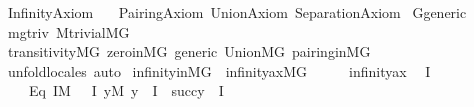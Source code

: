 %
\begin{isabellebody}%
%
%
\isadelimdocument
%
\endisadelimdocument
%
\isatagdocument
%
\isamarkuptrue%
%
\endisatagdocument
{\isafolddocument}%
%
\isadelimdocument
%
\endisadelimdocument
%
\isadelimtheory
%
\endisadelimtheory
%
\isatagtheory
{}\isamarkupfalse%
\ Infinity{\isacharunderscore}{\kern0pt}Axiom\isanewline
\ \ \ Pairing{\isacharunderscore}{\kern0pt}Axiom\ Union{\isacharunderscore}{\kern0pt}Axiom\ Separation{\isacharunderscore}{\kern0pt}Axiom\isanewline
{}%
\endisatagtheory
{\isafoldtheory}%
%
\isadelimtheory
\isanewline
%
\endisadelimtheory
\isanewline
{}\isamarkupfalse%
\ G{\isacharunderscore}{\kern0pt}generic\ \isanewline
\isanewline
{}\isamarkupfalse%
\ mg{\isacharunderscore}{\kern0pt}triv{\isacharcolon}{\kern0pt}\ M{\isacharunderscore}{\kern0pt}trivial{\isachardoublequoteopen}{\isacharhash}{\kern0pt}{\isacharhash}{\kern0pt}M{\isacharbrackleft}{\kern0pt}G{\isacharbrackright}{\kern0pt}{\isachardoublequoteclose}\isanewline
%
\isadelimproof
\ \ %
\endisadelimproof
%
\isatagproof
{}\isamarkupfalse%
\ transitivity{\isacharunderscore}{\kern0pt}MG\ zero{\isacharunderscore}{\kern0pt}in{\isacharunderscore}{\kern0pt}MG\ generic\ Union{\isacharunderscore}{\kern0pt}MG\ pairing{\isacharunderscore}{\kern0pt}in{\isacharunderscore}{\kern0pt}MG\isanewline
\ \ \isamarkupfalse%
\ unfold{\isacharunderscore}{\kern0pt}locales\ auto%
\endisatagproof
{\isafoldproof}%
%
\isadelimproof
\isanewline
%
\endisadelimproof
\isanewline
{}\isamarkupfalse%
\ infinity{\isacharunderscore}{\kern0pt}in{\isacharunderscore}{\kern0pt}MG\ {\isacharcolon}{\kern0pt}\ {\isachardoublequoteopen}infinity{\isacharunderscore}{\kern0pt}ax{\isacharparenleft}{\kern0pt}{\isacharhash}{\kern0pt}{\isacharhash}{\kern0pt}M{\isacharbrackleft}{\kern0pt}G{\isacharbrackright}{\kern0pt}{\isacharparenright}{\kern0pt}{\isachardoublequoteclose}\isanewline
%
\isadelimproof
%
\endisadelimproof
%
\isatagproof
{}\isamarkupfalse%
\ {\isacharminus}{\kern0pt}\isanewline
\ \ \isamarkupfalse%
\ infinity{\isacharunderscore}{\kern0pt}ax\ \isamarkupfalse%
\ I\ \isanewline
\ \ \ \ Eq{}{\isacharcolon}{\kern0pt}\ {\isachardoublequoteopen}I{\isasymin}M{\isachardoublequoteclose}\ {\isachardoublequoteopen}{}\ {\isasymin}\ I{\isachardoublequoteclose}\ {\isachardoublequoteopen}{\isasymforall}y{\isasymin}M{\isachardot}{\kern0pt}\ y\ {\isasymin}\ I\ {\isasymlongrightarrow}\ succ{\isacharparenleft}{\kern0pt}y{\isacharparenright}{\kern0pt}\ {\isasymin}\ I{\isachardoublequoteclose}\isanewline

\end{isabellebody}
